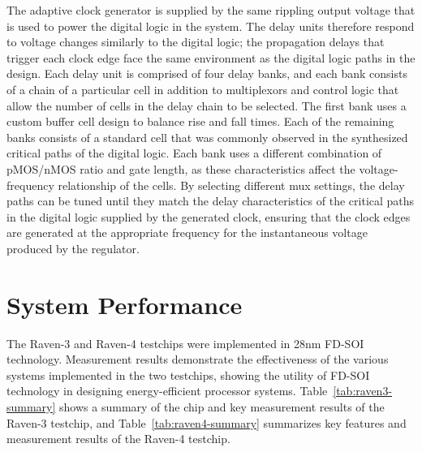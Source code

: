\documentclass[graybox]{svmult}
\begin{document}
The adaptive clock generator is supplied by the same rippling output voltage that is used to power the digital logic in the system.
The delay units therefore respond to voltage changes similarly to the digital logic; the propagation delays that trigger each clock edge face the same environment as the digital logic paths in the design.
Each delay unit is comprised of four delay banks, and each bank consists of a chain of a particular cell in addition to multiplexors and control logic that allow the number of cells in the delay chain to be selected.
The first bank uses a custom buffer cell design to balance rise and fall times.
Each of the remaining banks consists of a standard cell that was commonly observed in the synthesized critical paths of the digital logic.
Each bank uses a different combination of pMOS/nMOS ratio and gate length, as these characteristics affect the voltage-frequency relationship of the cells.
By selecting different mux settings, the delay paths can be tuned until they match the delay characteristics of the critical paths in the digital logic supplied by the generated clock, ensuring that the clock edges are generated at the appropriate frequency for the instantaneous voltage produced by the regulator.

\section{System Performance}

The Raven-3 and Raven-4 testchips were implemented in 28nm FD-SOI technology.
Measurement results demonstrate the effectiveness of the various systems implemented in the two testchips, showing the utility of FD-SOI technology in designing energy-efficient processor systems.
Table~\ref{tab:raven3-summary} shows a summary of the chip and key measurement results of the Raven-3 testchip, and Table~\ref{tab:raven4-summary} summarizes key features and measurement results of the Raven-4 testchip.
\end{document}
